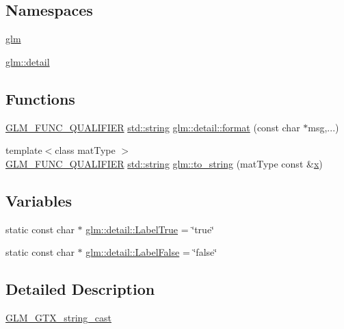 \subsection*{Namespaces}
\begin{DoxyCompactItemize}
\item 
 \mbox{\hyperlink{namespaceglm}{glm}}
\item 
 \mbox{\hyperlink{namespaceglm_1_1detail}{glm\+::detail}}
\end{DoxyCompactItemize}
\subsection*{Functions}
\begin{DoxyCompactItemize}
\item 
\mbox{\hyperlink{setup_8hpp_a33fdea6f91c5f834105f7415e2a64407}{G\+L\+M\+\_\+\+F\+U\+N\+C\+\_\+\+Q\+U\+A\+L\+I\+F\+I\+ER}} \mbox{\hyperlink{_s_d_l__opengl__glext_8h_ae84541b4f3d8e1ea24ec0f466a8c568b}{std\+::string}} \mbox{\hyperlink{namespaceglm_1_1detail_acd5305bbd1c5417b1eb770faf8229d14}{glm\+::detail\+::format}} (const char $\ast$msg,...)
\item 
{\footnotesize template$<$class mat\+Type $>$ }\\\mbox{\hyperlink{setup_8hpp_a33fdea6f91c5f834105f7415e2a64407}{G\+L\+M\+\_\+\+F\+U\+N\+C\+\_\+\+Q\+U\+A\+L\+I\+F\+I\+ER}} \mbox{\hyperlink{_s_d_l__opengl__glext_8h_ae84541b4f3d8e1ea24ec0f466a8c568b}{std\+::string}} \mbox{\hyperlink{namespaceglm_a8e7a49fe8e0b47b1ffe98cc215142c8e}{glm\+::to\+\_\+string}} (mat\+Type const \&\mbox{\hyperlink{_s_d_l__opengl_8h_ad0e63d0edcdbd3d79554076bf309fd47}{x}})
\end{DoxyCompactItemize}
\subsection*{Variables}
\begin{DoxyCompactItemize}
\item 
static const char $\ast$ \mbox{\hyperlink{namespaceglm_1_1detail_acbf3b3879c4dca6a03fa14892e0beb85}{glm\+::detail\+::\+Label\+True}} = \char`\"{}true\char`\"{}
\item 
static const char $\ast$ \mbox{\hyperlink{namespaceglm_1_1detail_a9af06cfdb4ef874dc5c30348835bc549}{glm\+::detail\+::\+Label\+False}} = \char`\"{}false\char`\"{}
\end{DoxyCompactItemize}


\subsection{Detailed Description}
\mbox{\hyperlink{group__gtx__string__cast}{G\+L\+M\+\_\+\+G\+T\+X\+\_\+string\+\_\+cast}} 